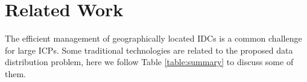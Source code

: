 \section{Related Work}

\begin{table*}[t]
\begin{center}
\end{center}
\vspace{-0.4cm}
\caption{ Summary of prior works. Data source means when choosing a sender, whether the sender is determined. For undetermined situations, one optimal sender is chosen from multiple candidate senders.}
\label{table:summary}
\end{table*}

The efficient management of geographically located IDCs is a common challenge for large ICPs. Some traditional technologies are related to the proposed data distribution problem, here we follow Table \ref{table:summary} to discuss some of them.

